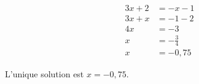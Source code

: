 \exercice*

\begin{align*}
  3x+2 &= -x-1 \\
  3x+x &= -1-2 \\
  4x &= -3 \\
  x &= -\frac{3}{4} \\
  x &= -0,75
\end{align*}

L'unique solution est $x=-0,75$.

